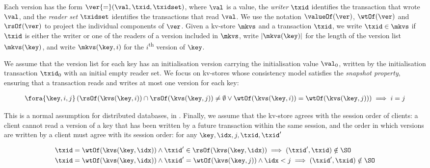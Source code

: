 Each version has the form 
\(\ver {=} (\val, \txid, \txidset)\), where \(\val\) is
a value, the \emph{writer} \(\txid\) identifies the transaction that
wrote \(\val\),  and the \emph{reader set} \(\txidset\) identifies the
transactions that read \(\val\). We use the notation 
\(\valueOf(\ver)\),
\(\wtOf(\ver)\) and \(\rsOf(\ver)\) to project
the individual components of \(\ver\).
Given a kv-store \(\mkvs\) and a transaction \(\txid\), we write 
\(\txid \in \mkvs\) if \(\txid\) is either the writer or 
one of the readers of a version included in \(\mkvs\), 
write \(\lvert \mkvs(\key) \rvert\) for the length of the version
list \(\mkvs(\key)\),
and write \(\mkvs(\key, i)\) for the \(i\)\textsuperscript{th} version of \(\key\).

We assume that the version list for each key has an initialisation version 
carrying the initialisation value \(\val_0\),  written by the 
initialisation transaction \(\txid_0\) with an initial empty reader set.
We focus on kv-stores whose consistency model satisfies the
\emph{snapshot property}, ensuring that
a transaction reads and writes at most one version for each key:

\SpaceAboveMath
\begin{align}
\fora{\key, i, j} 
\left( \rsOf(\kvs(\key, i)) \cap \rsOf(\kvs(\key, j)) \neq \emptyset \lor
\wtOf(\kvs(\key, i)) = \wtOf(\kvs(\key, j)) \right)
\implies i = j  
\label{equ:kvs-wf-txid-snapshot-property} 
\end{align}
\SpaceBelowMath

\noindent 
This is a normal assumption for distributed databases, \eg in \cite{ramp,rola,cops,wren,redblue,PSI,NMSI,gdur,clocksi,distrsi}.
Finally, we assume that the kv-store agrees with the session order of clients: 
a client cannot read a
version of a key that has been written by a future transaction within
the same session, and the order in which versions are written by a
client must agree with its session order:
for any \( \key,\idx,j,\txid,\txid' \)

\SpaceAboveMath
\begin{align}
& \txid = \wtOf(\kvs(\key,\idx))
\land \txid' \in \rsOf(\kvs(\key,\idx))
\implies (\txid', \txid) \notin \SO
\label{equ:kvs-wf-so-wr}
\\ & \txid = \wtOf(\kvs(\key,\idx))
\land \txid' = \wtOf(\kvs(\key,j))
\land \idx < j
\implies (\txid', \txid) \notin \SO
\label{equ:kvs-wf-so-ww}
\end{align}
\SpaceBelowMath

